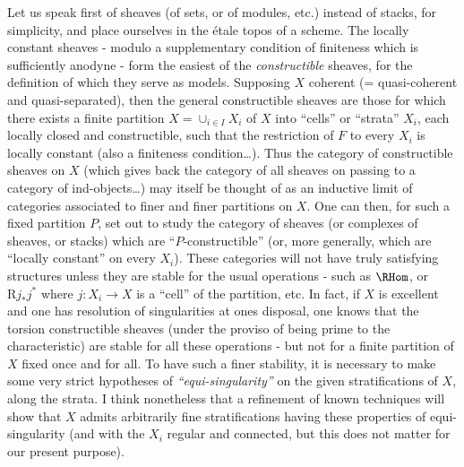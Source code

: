 Let us speak first of sheaves (of sets, or of modules, etc.) instead of stacks, for simplicity, and place ourselves in the étale topos of a scheme. The locally constant sheaves - modulo a supplementary condition of finiteness which is sufficiently anodyne - form the easiest of the \emph{constructible} sheaves, for the definition of which they serve as models. Supposing $X$ coherent (= quasi-coherent and quasi-separated), then the general constructible sheaves are those for which there exists a finite partition $X = \cup_{i \in I} X_i$ of $X$ into ``cells'' or ``strata'' $X_i$, each locally closed and constructible, such that the restriction of $F$ to every $X_i$ is locally constant (also a finiteness condition\dots). Thus the category of constructible sheaves on $X$ (which gives back the category of all sheaves on passing to a category of ind-objects\dots) may itself be thought of as an inductive limit of categories associated to finer and finer partitions on $X$. One can then, for such a fixed partition $P$, set out to study the category of sheaves (or complexes of sheaves, or stacks) which are ``$P$-constructible'' (or, more generally, which are ``locally constant'' on every $X_i$). These categories will not have truly satisfying structures unless they are stable for the usual operations - such as $\RHom$, or $\mathrm{R}j_* j^*$ where $j: X_i \to X$ is a ``cell'' of the partition, etc. In fact, if $X$ is excellent and one has resolution of singularities at ones disposal, one knows that the torsion constructible sheaves (under the proviso of being prime to the characteristic) are stable for all these operations - but not for a finite partition of $X$ fixed once and for all. To have such a finer stability, it is necessary to make some very strict hypotheses of \emph{``equi-singularity''} on the given stratifications of $X$, along the strata. I think nonetheless that a refinement of known techniques will show that $X$ admits arbitrarily fine stratifications having these properties of equi-singularity (and with the $X_i$ regular and connected, but this does not matter for our present purpose).

